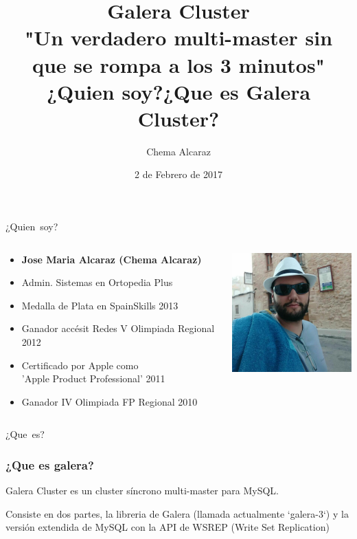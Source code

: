 \documentclass[UTF8]{beamer}
\title[Portada]{
	Galera Cluster \\
	\large "Un verdadero multi-master sin que se rompa a los 3 minutos"\\
}
\author{Chema Alcaraz}
\date{2 de Febrero de 2017}
\begin{document}
	
\begin{frame}
	\titlepage
\end{frame}

\title{¿Quien soy?}

\begin{frame}
	\centering
	\mbox{¿Quien soy?}	
\end{frame}


\begin{frame}
\begin{columns}
    \begin{column}{0.6\textwidth}
        \begin{itemize}
            \item \textbf{Jose Maria Alcaraz (Chema Alcaraz)}
            \item Admin. Sistemas en Ortopedia Plus
    	    \item Medalla de Plata en SpainSkills 2013
	    \item Ganador accésit Redes V Olimpiada Regional 2012
	    \item Certificado por Apple como \\'Apple Product Professional' 2011
            \item Ganador IV Olimpiada FP Regional 2010
        \end{itemize}
    \end{column}
    \begin{column}{0.40\textwidth}
        \includegraphics[width=5cm]{images/yo}
    \end{column}
\end{columns}
	
\end{frame}


\title{¿Que es Galera Cluster?}

\begin{frame}
	\centering
	\mbox{¿Que es?}	
\end{frame}


\begin{frame}
	\frametitle{¿Que es galera?}
	\begin{framed}
		Galera Cluster es un cluster síncrono multi-master para MySQL.
	\end{framed}
	\pause
	\begin{framed}
		Consiste en dos partes, la libreria de Galera (llamada actualmente `galera-3`) y la versión extendida de MySQL con la API de WSREP (Write Set Replication)
	\end{framed}
\end{frame}
\end{document}
